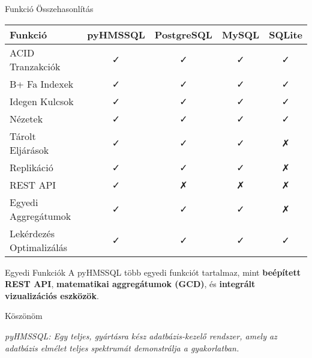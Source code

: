 \documentclass[aspectratio=169]{beamer}
\begin{document}
\begin{frame}{Funkció Összehasonlítás}
\begin{center}
\begin{tabular}{|l|c|c|c|c|}
\hline
\textbf{Funkció} & \textbf{pyHMSSQL} & \textbf{PostgreSQL} & \textbf{MySQL} & \textbf{SQLite} \\
\hline
ACID Tranzakciók & ✓ & ✓ & ✓ & ✓ \\
B+ Fa Indexek & ✓ & ✓ & ✓ & ✓ \\
Idegen Kulcsok & ✓ & ✓ & ✓ & ✓ \\
Nézetek & ✓ & ✓ & ✓ & ✓ \\
Tárolt Eljárások & ✓ & ✓ & ✓ & ✗ \\
Replikáció & ✓ & ✓ & ✓ & ✗ \\
REST API & ✓ & ✗ & ✗ & ✗ \\
Egyedi Aggregátumok & ✓ & ✓ & ✓ & ✗ \\
Lekérdezés Optimalizálás & ✓ & ✓ & ✓ & ✓ \\
\hline
\end{tabular}
\end{center}

\begin{alertblock}{Egyedi Funkciók}
A pyHMSSQL több egyedi funkciót tartalmaz, mint \textbf{beépített REST API}, \textbf{matematikai aggregátumok (GCD)}, és \textbf{integrált vizualizációs eszközök}.
\end{alertblock}
\end{frame}

\begin{frame}[c]
\begin{center}
{\Huge Köszönöm}

\vspace{1cm}

\vspace{1cm}

\textit{pyHMSSQL: Egy teljes, gyártásra kész adatbázis-kezelő rendszer, amely az adatbázis elmélet teljes spektrumát demonstrálja a gyakorlatban.}
\end{center}
\end{frame}
\end{document}
